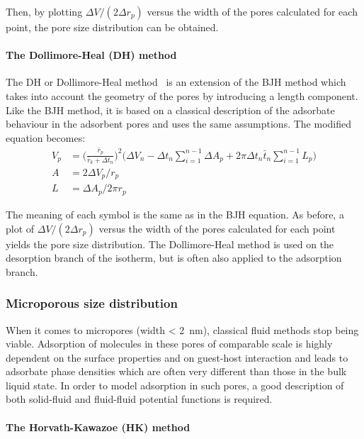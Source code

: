Then, by plotting \(\Delta V / (2\Delta r_p)\) versus the width
of the pores calculated for each point, the pore size distribution
can be obtained.

\paragraph{The Dollimore-Heal (DH) method}

The \gls{DH} or Dollimore-Heal
method~\cite{dollimorePoresizeDistributionTypical1970}
is an extension of the \gls{BJH} method which takes into account the
geometry of the pores by introducing a length component.
Like the \gls{BJH} method, it is based on a classical description of
the adsorbate behaviour in the adsorbent pores and uses the
same assumptions. The modified equation becomes:
%
\begin{align}
	V_p & = \Big(\frac{\bar{r}_p}{\bar{r}_k + \Delta t_n}\Big)^2
	\Big(\Delta V_n - \Delta t_n \sum_{i=1}^{n-1} \Delta A_p
	+ 2 \pi \Delta t_n \bar{t}_n \sum_{i=1}^{n-1} L_p\Big)       \\
	A   & = 2 \Delta V_p / r_p                                   \\
	L   & = \Delta A_p / 2 \pi r_p
\end{align}

The meaning of each symbol is the same as in the \gls{BJH} equation.
As before, a plot of \(\Delta V/(2\Delta r_p)\) versus the width of
the pores calculated for each point yields the pore size distribution.
The Dollimore-Heal method is used on the desorption branch
of the isotherm, but is often also applied to the adsorption branch.

\subsubsection{Microporous size distribution}

When it comes to micropores (width \SI{< 2}{\nano\metre}), classical
fluid methods stop being viable. Adsorption of molecules in these pores
of comparable scale is highly dependent on the surface properties and
on guest-host interaction and leads to adsorbate phase densities
which are often very different than those in the bulk liquid state.
In order to model adsorption in such pores, a good description of
both solid-fluid and fluid-fluid potential functions is required.

\paragraph{The Horvath-Kawazoe (HK) method}

